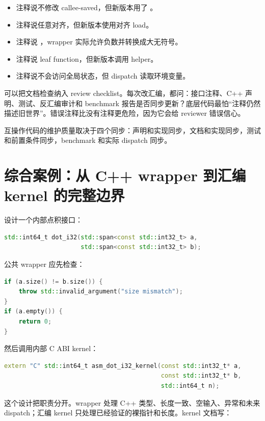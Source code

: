 \begin{itemize}
  \item 注释说不修改 callee-saved，但新版本用了 。
  \item 注释说任意对齐，但新版本使用对齐 load。
  \item 注释说 ，wrapper 实际允许负数并转换成大无符号。
  \item 注释说 leaf function，但新版本调用 helper。
  \item 注释说不会访问全局状态，但 dispatch 读取环境变量。
\end{itemize}

可以把文档检查纳入 review checklist。每次改汇编，都问：接口注释、C++ 声明、测试、反汇编审计和 benchmark 报告是否同步更新？底层代码最怕“注释仍然描述旧世界”。错误注释比没有注释更危险，因为它会给 reviewer 错误信心。

\begin{keyidea}
互操作代码的维护质量取决于四个同步：声明和实现同步，文档和实现同步，测试和前置条件同步，benchmark 和实际 dispatch 同步。
\end{keyidea}

\section{综合案例：从 C++ wrapper 到汇编 kernel 的完整边界}

设计一个内部点积接口：

\begin{lstlisting}[language=C++]
std::int64_t dot_i32(std::span<const std::int32_t> a,
                     std::span<const std::int32_t> b);
\end{lstlisting}

公共 wrapper 应先检查：

\begin{lstlisting}[language=C++]
if (a.size() != b.size()) {
    throw std::invalid_argument("size mismatch");
}
if (a.empty()) {
    return 0;
}
\end{lstlisting}

然后调用内部 C ABI kernel：

\begin{lstlisting}[language=C++]
extern "C" std::int64_t asm_dot_i32_kernel(const std::int32_t* a,
                                           const std::int32_t* b,
                                           std::int64_t n);
\end{lstlisting}

这个设计把职责分开。wrapper 处理 C++ 类型、长度一致、空输入、异常和未来 dispatch；汇编 kernel 只处理已经验证的裸指针和长度。kernel 文档写：

